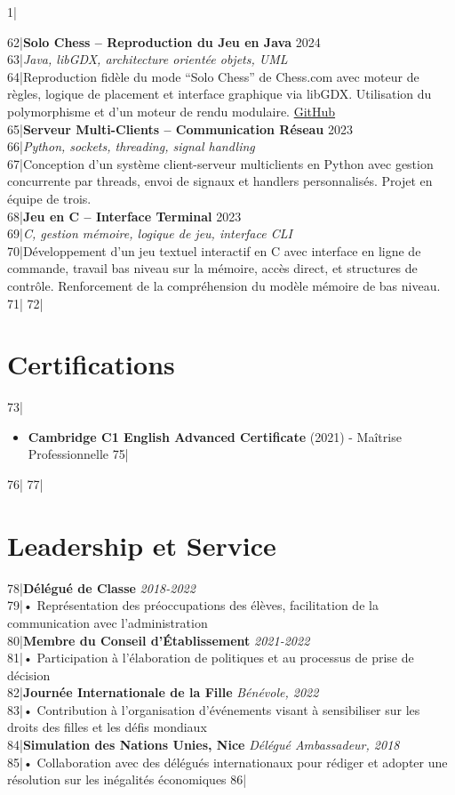 1|\documentclass[a4paper,10pt]{article}
\begin{document}
62|\textbf{Solo Chess – Reproduction du Jeu en Java} \hfill 2024 \\
63|\textit{Java, libGDX, architecture orientée objets, UML} \\
64|Reproduction fidèle du mode “Solo Chess” de Chess.com avec moteur de règles, logique de placement et interface graphique via libGDX. Utilisation du polymorphisme et d’un moteur de rendu modulaire. \href{https://github.com/TerminalGambit/PCOO-projetfinal}{GitHub}\\
65|\textbf{Serveur Multi-Clients – Communication Réseau} \hfill 2023 \\
66|\textit{Python, sockets, threading, signal handling} \\
67|Conception d’un système client-serveur multiclients en Python avec gestion concurrente par threads, envoi de signaux et handlers personnalisés. Projet en équipe de trois.\\
68|\textbf{Jeu en C – Interface Terminal} \hfill 2023 \\
69|\textit{C, gestion mémoire, logique de jeu, interface CLI} \\
70|Développement d’un jeu textuel interactif en C avec interface en ligne de commande, travail bas niveau sur la mémoire, accès direct, et structures de contrôle. Renforcement de la compréhension du modèle mémoire de bas niveau.
71|
72|\section*{Certifications}
73|\begin{itemize}
74|    \item \textbf{Cambridge C1 English Advanced Certificate} (2021) - Maîtrise Professionnelle
75|\end{itemize}
76|
77|\section*{Leadership et Service}
78|\textbf{Délégué de Classe} \hfill \textit{2018-2022}\\
79|• Représentation des préoccupations des élèves, facilitation de la communication avec l’administration\\
80|\textbf{Membre du Conseil d’Établissement} \hfill \textit{2021-2022}\\
81|• Participation à l’élaboration de politiques et au processus de prise de décision\\
82|\textbf{Journée Internationale de la Fille} \hfill \textit{Bénévole, 2022}\\
83|• Contribution à l’organisation d’événements visant à sensibiliser sur les droits des filles et les défis mondiaux\\
84|\textbf{Simulation des Nations Unies, Nice} \hfill \textit{Délégué Ambassadeur, 2018}\\
85|• Collaboration avec des délégués internationaux pour rédiger et adopter une résolution sur les inégalités économiques
86|
\end{document}
